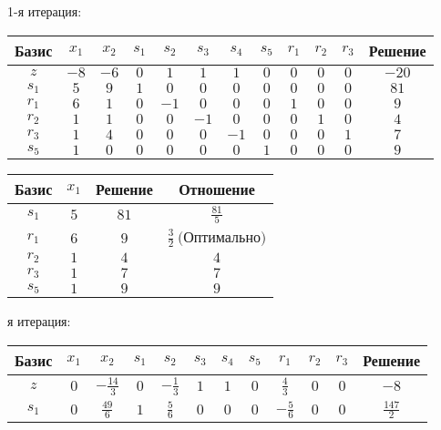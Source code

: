 \documentclass{article}%
\begin{document}
\begin{flushleft}%
1{-}я итерация: %
\newline%
\newline%
\renewcommand{\arraystretch}{1.3}%
\begin{tabular}{|c|cccccccccc|c|}%
\hline%
Базис&$x_{1}$&$x_{2}$&$s_{1}$&$s_{2}$&$s_{3}$&$s_{4}$&$s_{5}$&$r_{1}$&$r_{2}$&$r_{3}$&Решение\\%
\hline%
$z$&$-8$&$-6$&$0$&$1$&$1$&$1$&$0$&$0$&$0$&$0$&$-20$\\%
\hline%
$s_{1}$&$5$&$9$&$1$&$0$&$0$&$0$&$0$&$0$&$0$&$0$&$81$\\%
$r_{1}$&$6$&$1$&$0$&$-1$&$0$&$0$&$0$&$1$&$0$&$0$&$9$\\%
$r_{2}$&$1$&$1$&$0$&$0$&$-1$&$0$&$0$&$0$&$1$&$0$&$4$\\%
$r_{3}$&$1$&$4$&$0$&$0$&$0$&$-1$&$0$&$0$&$0$&$1$&$7$\\%
$s_{5}$&$1$&$0$&$0$&$0$&$0$&$0$&$1$&$0$&$0$&$0$&$9$\\%
\hline%
\end{tabular}%
\newline%
\newline%
\newline%
\begin{tabular}{|cccc|}%
\hline%
Базис&$x_{1}$&Решение&Отношение\\%
\hline%
$s_{1}$&$5$&$81$&$\frac{81}{5}$\\%
$r_{1}$&$6$&$9$&$\frac{3}{2}\: \text{(Оптимально)}$\\%
$r_{2}$&$1$&$4$&$4$\\%
$r_{3}$&$1$&$7$&$7$\\%
$s_{5}$&$1$&$9$&$9$\\%
\hline%
\end{tabular}%
\newline%
\newline%
я итерация: %
\newline%
\newline%
\renewcommand{\arraystretch}{1.3}%
\begin{tabular}{|c|cccccccccc|c|}%
\hline%
Базис&$x_{1}$&$x_{2}$&$s_{1}$&$s_{2}$&$s_{3}$&$s_{4}$&$s_{5}$&$r_{1}$&$r_{2}$&$r_{3}$&Решение\\%
\hline%
$z$&$0$&$-\frac{14}{3}$&$0$&$-\frac{1}{3}$&$1$&$1$&$0$&$\frac{4}{3}$&$0$&$0$&$-8$\\%
\hline%
$s_{1}$&$0$&$\frac{49}{6}$&$1$&$\frac{5}{6}$&$0$&$0$&$0$&$-\frac{5}{6}$&$0$&$0$&$\frac{147}{2}$\\%

\end{tabular}
\end{flushleft}
\end{document}
